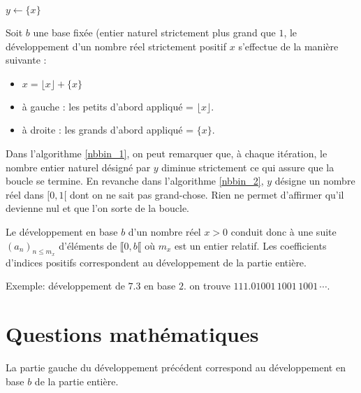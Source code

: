 \begin{algorithm}
  $y\longleftarrow \{ x \}$\;
  \caption{\`A droite: les grands d'abord.}
  \label{nbbin_2}
\end{algorithm}
Soit $b$ une base fixée (entier naturel strictement plus grand que $1$, le développement d'un nombre réel strictement positif $x$  s'effectue de la manière suivante :
\begin{itemize}
  \item $x = \lfloor x \rfloor + \{x\}$
  \item à gauche : \og les petits d'abord \fg appliqué = $\lfloor x \rfloor$.
  \item à droite : \og les grands d'abord \fg appliqué = $\{ x \}$.
\end{itemize}

Dans l'algorithme \ref{nbbin_1}, on peut remarquer que, à chaque itération, le nombre entier naturel désigné par $y$ diminue strictement ce qui assure que la boucle se termine. En revanche dans l'algorithme \ref{nbbin_2}, $y$ désigne un nombre réel dans $[0,1[$ dont on ne sait pas grand-chose. Rien ne permet d'affirmer qu'il devienne nul et que l'on sorte de la boucle. 

Le développement en base $b$ d'un nombre réel $x>0$ conduit donc à une suite $\left( a_n\right)_{n\leq m_x}$ d'éléments de $\llbracket 0 , b \llbracket$ où $m_x$ est un entier relatif. Les coefficients d'indices positifs correspondent au développement de la partie entière.


Exemple: développement de $7.3$ en base $2$. on trouve $111.01001\,1001\,1001\,\cdots$.

\section{Questions mathématiques}
La partie gauche du développement précédent correspond au développement en base $b$ de la partie entière.

